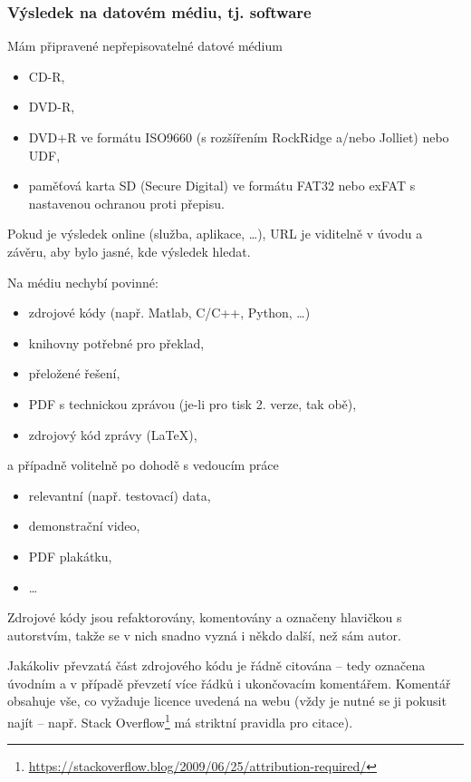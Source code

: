 \subsubsection*{Výsledek na datovém médiu, tj. software}
\begin{checklist}
	\item Mám připravené nepřepisovatelné datové médium 
      \begin{itemize}
	  		\item CD-R,
            \item DVD-R,
            \item DVD+R ve formátu ISO9660 (s rozšířením RockRidge a/nebo Jolliet) nebo UDF,
            \item paměťová karta SD (Secure Digital) ve formátu FAT32 nebo exFAT s nastavenou ochranou proti přepisu.
      \end{itemize}
	\item Pokud je výsledek online (služba, aplikace, \dots), URL je viditelně v úvodu a závěru, aby bylo jasné, kde výsledek hledat.
	\item Na médiu nechybí povinné: 
    	\begin{itemize}
    		\item zdrojové kódy (např. Matlab, C/C++, Python, \dots)
            \item knihovny potřebné pro překlad,
            \item přeložené řešení,
            \item PDF s technickou zprávou (je-li pro tisk 2. verze, tak obě),
            \item zdrojový kód zprávy (\LaTeX), 
    	\end{itemize}
        a případně volitelně po dohodě s vedoucím práce
		\begin{itemize}
			\item relevantní (např. testovací) data, 
            \item demonstrační video,
            \item PDF plakátku,
            \item \dots
		\end{itemize}        
	\item Zdrojové kódy jsou refaktorovány, komentovány a označeny hlavičkou s autorstvím, takže se v nich snadno vyzná i někdo další, než sám autor.
    \item Jakákoliv převzatá část zdrojového kódu je řádně citována -- tedy označena úvodním a v případě převzetí více řádků i ukončovacím komentářem. Komentář obsahuje vše, co vyžaduje licence uvedená na webu (vždy je nutné se ji pokusit najít -- např. Stack Overflow\footnote{\url{https://stackoverflow.blog/2009/06/25/attribution-required/}} má striktní pravidla pro citace).
\end{checklist}

